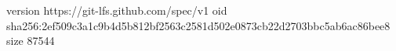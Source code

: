 version https://git-lfs.github.com/spec/v1
oid sha256:2ef509c3a1c9b4d5b812bf2563c2581d502e0873cb22d2703bbc5ab6ac86bee8
size 87544
